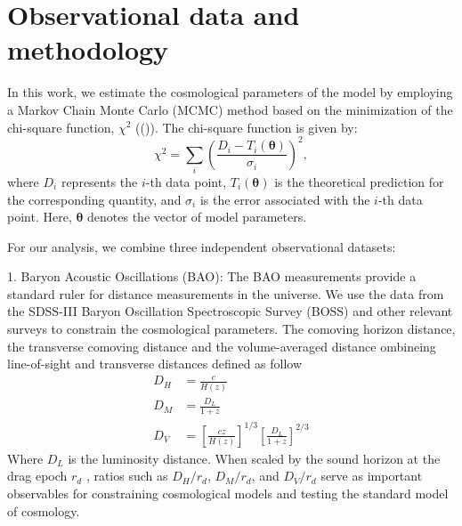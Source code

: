 \documentclass[preprint]{aastex631}
\begin{document}
\section{Observational data and methodology}

In this work, we estimate the cosmological parameters of the model by employing a Markov Chain Monte Carlo (MCMC) method based on the minimization of the chi-square function, \(\chi^2\) ((\cite{Padilla_2021})). The chi-square function is given by:
\begin{equation}
\chi^2 = \sum_i \left(\frac{D_i - T_i(\mathbf{\theta})}{\sigma_i}\right)^2,
\end{equation}
where \(D_i\) represents the \(i\)-th data point, \(T_i(\mathbf{\theta})\) is the theoretical prediction for the corresponding quantity, and \(\sigma_i\) is the error associated with the \(i\)-th data point. Here, \(\mathbf{\theta}\) denotes the vector of model parameters.

For our analysis, we combine three independent observational datasets:

1. Baryon Acoustic Oscillations (BAO): The BAO measurements provide a standard ruler for distance measurements in the universe. We use the data from the SDSS-III Baryon Oscillation Spectroscopic Survey (BOSS) and other relevant surveys to constrain the cosmological parameters. The comoving horizon distance, the transverse comoving distance
and the volume-averaged distance ombineing line-of-sight and transverse distances defined as follow
\begin{align}
    D_H&=\frac{c}{H(z)} \\
    D_M&=\frac{D_L}{1+z}\\
    D_V&=\left[\frac{cz}{H(z)}\right]^{1/3}\left[\frac{D_L}{1+z}\right]^{2/3}
\end{align}
Where $D_L$ is the luminosity distance. When scaled by the sound horizon at the drag epoch \(r_d\) , ratios such as \(D_H/r_d\), \(D_M/r_d\), and \(D_V/r_d\) serve as important observables for constraining cosmological models and testing the standard model of cosmology.
\end{document}
